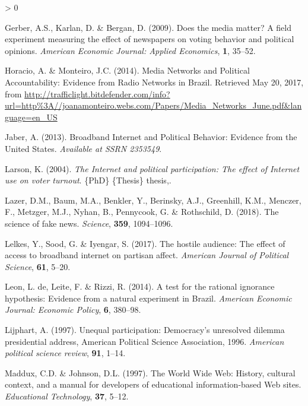 \documentclass[
  12pt,
]{article}
\newlength{\cslhangindent}
\newenvironment{CSLReferences}[2] %
 {%
  \setlength{\parindent}{0pt}
  \ifodd #1 \everypar{\setlength{\hangindent}{\cslhangindent}}\ignorespaces\fi
  \ifnum #2 > 0
  \setlength{\parskip}{#2\baselineskip}
  \fi
 }%
 {}
\begin{document}
\begin{CSLReferences}{1}{0}
\leavevmode\hypertarget{ref-gerber_does_2009}{}%
Gerber, A.S., Karlan, D. \& Bergan, D. (2009). Does the media matter?
{A} field experiment measuring the effect of newspapers on voting
behavior and political opinions. \emph{American Economic Journal:
Applied Economics}, \textbf{1}, 35--52.

\leavevmode\hypertarget{ref-horacio_media_2014}{}%
Horacio, A. \& Monteiro, J.C. (2014). Media {Networks} and {Political}
{Accountability}: {Evidence} from {Radio} {Networks} in {Brazil}.
Retrieved May 20, 2017, from
\url{http://trafficlight.bitdefender.com/info?url=http\%3A//joanamonteiro.webs.com/Papers/Media_Networks_June.pdf\&language=en_US}

\leavevmode\hypertarget{ref-jaber_broadband_2013}{}%
Jaber, A. (2013). Broadband {Internet} and {Political} {Behavior}:
{Evidence} from the {United} {States}. \emph{Available at SSRN 2353549}.

\leavevmode\hypertarget{ref-larson_internet_2004}{}%
Larson, K. (2004). \emph{The {Internet} and political participation: The
effect of {Internet} use on voter turnout}. \{PhD\} \{Thesis\} thesis,.

\leavevmode\hypertarget{ref-lazer_science_2018}{}%
Lazer, D.M., Baum, M.A., Benkler, Y., Berinsky, A.J., Greenhill, K.M.,
Menczer, F., Metzger, M.J., Nyhan, B., Pennycook, G. \& Rothschild, D.
(2018). The science of fake news. \emph{Science}, \textbf{359},
1094--1096.

\leavevmode\hypertarget{ref-lelkes_hostile_2017}{}%
Lelkes, Y., Sood, G. \& Iyengar, S. (2017). The hostile audience: {The}
effect of access to broadband internet on partisan affect.
\emph{American Journal of Political Science}, \textbf{61}, 5--20.

\leavevmode\hypertarget{ref-de_leon_test_2014}{}%
Leon, L. de, Leite, F. \& Rizzi, R. (2014). A test for the rational
ignorance hypothesis: {Evidence} from a natural experiment in {Brazil}.
\emph{American Economic Journal: Economic Policy}, \textbf{6}, 380--98.

\leavevmode\hypertarget{ref-lijphart_unequal_1997}{}%
Lijphart, A. (1997). Unequal participation: {Democracy}'s unresolved
dilemma presidential address, {American} {Political} {Science}
{Association}, 1996. \emph{American political science review},
\textbf{91}, 1--14.

\leavevmode\hypertarget{ref-maddux_world_1997}{}%
Maddux, C.D. \& Johnson, D.L. (1997). The {World} {Wide} {Web}:
{History}, cultural context, and a manual for developers of educational
information-based {Web} sites. \emph{Educational Technology},
\textbf{37}, 5--12.


\end{CSLReferences}
\end{document}
